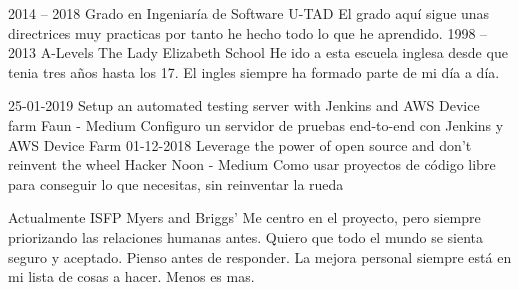 \documentclass[9pt]{developercv} %
\begin{document}


\begin{entrylist}
	\entry
		{2014 -- 2018}
		{Grado en Ingeniaría de Software}
		{U-TAD}
		{El grado aquí sigue unas directrices muy practicas por tanto he hecho todo lo que he aprendido.}
	\entry
		{1998 -- 2013}
		{A-Levels}
		{The Lady Elizabeth School}
    {He ido a esta escuela inglesa desde que tenia tres años hasta los 17. El ingles siempre ha formado parte de mi día a día.}
\end{entrylist}


\begin{entrylist}
	\entry
		{25-01-2019}
		{Setup an automated testing server with Jenkins and AWS Device farm}
		{Faun - Medium}
		{Configuro un servidor de pruebas end-to-end con Jenkins y AWS Device Farm}
	\entry
		{01-12-2018}
		{Leverage the power of open source and don’t reinvent the wheel}
		{Hacker Noon - Medium}
    {Como usar proyectos de código libre para conseguir lo que necesitas, sin reinventar la rueda}
\end{entrylist}


\begin{entrylist}
	\entry
		{Actualmente}
		{ISFP}
		{Myers and Briggs'}
		{Me centro en el proyecto, pero siempre priorizando las relaciones humanas antes.
		Quiero que todo el mundo se sienta seguro y aceptado.
		Pienso antes de responder.
		La mejora personal siempre está en mi lista de cosas a hacer.
		Menos es mas.}
\end{entrylist}

\end{document}
